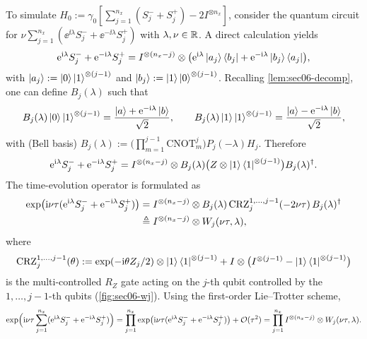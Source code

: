 To simulate $H_0 := \gamma_0[\sum_{j=1}^{n_x}(S_j^- + S_j^+) - 2I^{\otimes n_x}]$,
consider the quantum circuit for
$\nu\sum_{j=1}^{n_x}(\ee^{\ii\lambda}S_j^- + \ee^{-\ii\lambda}S_j^+)$ with
$\lambda, \nu \in \mathbb{R}$. A direct calculation yields
\begin{equation}
  \mathrm{e}^{\mathrm{i}\lambda}S_j^- + \mathrm{e}^{-\mathrm{i}\lambda}S_j^+
  = I^{\otimes(n_x - j)} \otimes \bigl(\mathrm{e}^{\mathrm{i}\lambda}\ket{a_j}\bra{b_j} + \mathrm{e}^{-\mathrm{i}\lambda}\ket{b_j}\bra{a_j}\bigr),
\end{equation}
with $\ket{a_j} := \ket{0}\ket{1}^{\otimes(j-1)}$ and
$\ket{b_j} := \ket{1}\ket{0}^{\otimes(j-1)}$. Recalling \cref{lem:sec06-decomp},
one can define $B_j(\lambda)$ such that
\begin{equation}
  B_j(\lambda)\ket{0}\ket{1}^{\otimes(j-1)} = \frac{\ket{a} + \mathrm{e}^{-\mathrm{i}\lambda}\ket{b}}{\sqrt{2}}, \qquad
  B_j(\lambda)\ket{1}\ket{1}^{\otimes(j-1)} = \frac{\ket{a} - \mathrm{e}^{-\mathrm{i}\lambda}\ket{b}}{\sqrt{2}},
\end{equation}
with (Bell basis) $B_j(\lambda) := \bigl(\prod_{m=1}^{j-1}\mathrm{CNOT}_m^j\bigr)P_j(-\lambda)H_j$.
Therefore
\begin{equation}
  \mathrm{e}^{\mathrm{i}\lambda}S_j^- + \mathrm{e}^{-\mathrm{i}\lambda}S_j^+
  = I^{\otimes(n_x - j)} \otimes B_j(\lambda)\bigl(Z \otimes \ket{1}\bra{1}^{\otimes(j-1)}\bigr)B_j(\lambda)^{\dagger}.
\end{equation}
The time-evolution operator is formulated as
\begin{align}
  \exp\bigl(\mathrm{i}\nu\tau(\mathrm{e}^{\mathrm{i}\lambda}S_j^- + \mathrm{e}^{-\mathrm{i}\lambda}S_j^+)\bigr)
  &= I^{\otimes(n_x - j)} \otimes B_j(\lambda)\, \mathrm{CRZ}_j^{1,\dots,j-1}(-2\nu\tau)\, B_j(\lambda)^{\dagger} \notag\\
  &\triangleq I^{\otimes(n_x - j)} \otimes W_j(\nu\tau, \lambda),
\end{align}
where
\begin{equation}
  \mathrm{CRZ}_j^{1,\dots,j-1}(\theta) := \exp(-\mathrm{i}\theta Z_j/2) \otimes \ket{1}\bra{1}^{\otimes(j-1)} + I \otimes \bigl(I^{\otimes(j-1)} - \ket{1}\bra{1}^{\otimes(j-1)}\bigr)
\end{equation}
is the multi-controlled $R_Z$ gate acting on the $j$-th qubit controlled by the
$1, \dots, j-1$-th qubits (\cref{fig:sec06-wj}). Using the first-order
Lie--Trotter scheme,
\begin{equation}
  \exp\Bigl(\mathrm{i}\nu\tau\sum_{j=1}^{n_x}(\mathrm{e}^{\mathrm{i}\lambda}S_j^- + \mathrm{e}^{-\mathrm{i}\lambda}S_j^+)\Bigr)
  = \prod_{j=1}^{n_x}\exp\bigl(\mathrm{i}\nu\tau(\mathrm{e}^{\mathrm{i}\lambda}S_j^- + \mathrm{e}^{-\mathrm{i}\lambda}S_j^+)\bigr) + \mathcal{O}(\tau^2)
  = \prod_{j=1}^{n_x} I^{\otimes(n_x - j)} \otimes W_j(\nu\tau, \lambda).
\end{equation}

